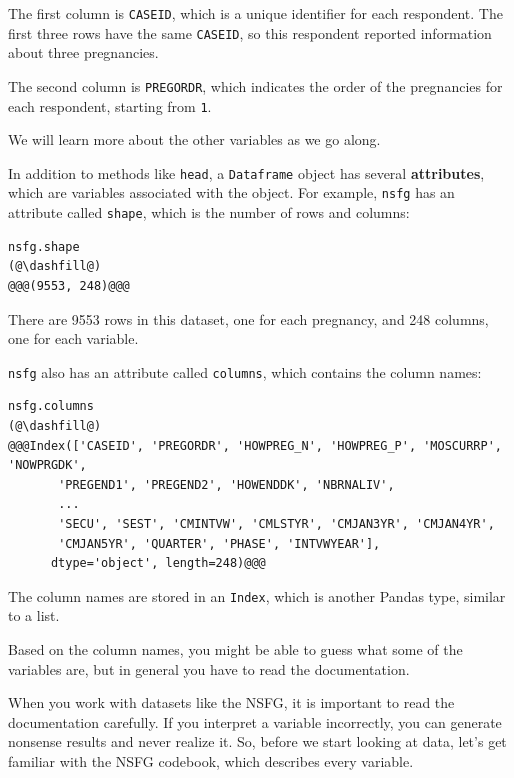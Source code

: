 The first column is \passthrough{\lstinline!CASEID!}, which is a unique
identifier for each respondent. The first three rows have the same
\passthrough{\lstinline!CASEID!}, so this respondent reported
information about three pregnancies.

The second column is \passthrough{\lstinline!PREGORDR!}, which indicates
the order of the pregnancies for each respondent, starting from
\passthrough{\lstinline!1!}.

We will learn more about the other variables as we go along.

In addition to methods like \passthrough{\lstinline!head!}, a
\passthrough{\lstinline!Dataframe!} object has several
\textbf{attributes}, which are variables associated with the object. For
example, \passthrough{\lstinline!nsfg!} has an attribute called
\passthrough{\lstinline!shape!}, which is the number of rows and
columns:

\begin{lstlisting}[]
nsfg.shape
(@\dashfill@)
@@@(9553, 248)@@@
\end{lstlisting}

There are 9553 rows in this dataset, one for each pregnancy, and 248
columns, one for each variable.

\passthrough{\lstinline!nsfg!} also has an attribute called
\passthrough{\lstinline!columns!}, which contains the column names:

\begin{lstlisting}[]
nsfg.columns
(@\dashfill@)
@@@Index(['CASEID', 'PREGORDR', 'HOWPREG_N', 'HOWPREG_P', 'MOSCURRP', 'NOWPRGDK',
       'PREGEND1', 'PREGEND2', 'HOWENDDK', 'NBRNALIV',
       ...
       'SECU', 'SEST', 'CMINTVW', 'CMLSTYR', 'CMJAN3YR', 'CMJAN4YR',
       'CMJAN5YR', 'QUARTER', 'PHASE', 'INTVWYEAR'],
      dtype='object', length=248)@@@
\end{lstlisting}

The column names are stored in an \passthrough{\lstinline!Index!}, which
is another Pandas type, similar to a list.

Based on the column names, you might be able to guess what some of the
variables are, but in general you have to read the documentation.

When you work with datasets like the NSFG, it is important to read the
documentation carefully. If you interpret a variable incorrectly, you
can generate nonsense results and never realize it. So, before we start
looking at data, let's get familiar with the NSFG codebook, which
describes every variable.

